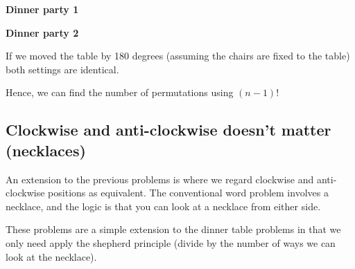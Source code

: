 \documentclass[12pt]{extbook}
\begin{document}
\begin{minipage}[t]{.45\textwidth}
\textbf{Dinner party 1}

\end{minipage}%
\begin{minipage}[t]{.45\textwidth}
\textbf{Dinner party 2}

\end{minipage}

If we moved the table by 180 degrees (assuming the chairs are fixed to the table) both settings are identical.



Hence, we can find the number of permutations using $(n-1)!$

\subsection{Clockwise and anti-clockwise doesn't matter (necklaces)}

An extension to the previous problems is where we regard clockwise and anti-clockwise positions as equivalent.   The conventional word problem involves a necklace, and the logic is that you can look at a necklace from either side.   

These problems are a simple extension to the dinner table problems in that we only need apply the shepherd principle (divide by the number of ways we can look at the necklace).

\end{document}
